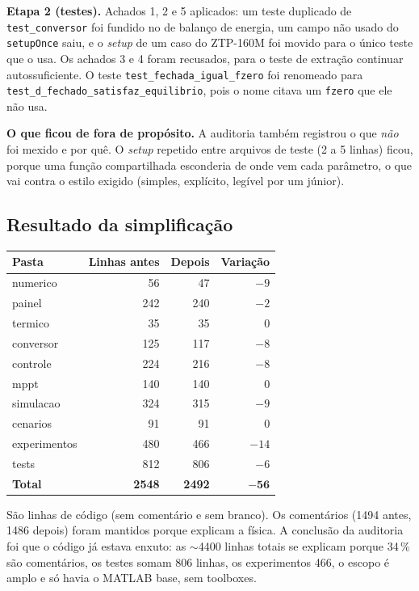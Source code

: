 \textbf{Etapa 2 (testes).} Achados 1, 2 e 5 aplicados: um teste duplicado de \texttt{test\_conversor} foi fundido no de balan\c{c}o de energia, um campo n\~ao usado do \texttt{setupOnce} saiu, e o
\emph{setup} de um caso do ZTP-160M foi movido para o \'unico teste que o usa. Os achados 3 e 4 foram recusados, para o teste de extra\c{c}\~ao continuar autossuficiente. O teste \texttt{test\_fechada\_igual\_fzero}
foi renomeado para \texttt{test\_d\_fechado\_satisfaz\_equilibrio}, pois o nome citava um \texttt{fzero} que ele n\~ao usa.

\textbf{O que ficou de fora de prop\'osito.} A auditoria tamb\'em registrou o que \emph{n\~ao} foi mexido e por qu\^e. O \emph{setup} repetido entre arquivos de teste (2 a 5 linhas) ficou, porque uma fun\c{c}\~ao compartilhada
esconderia de onde vem cada par\^ametro, o que vai contra o estilo exigido (simples, expl\'icito, leg\'ivel por um j\'unior).

\subsection{Resultado da simplifica\c{c}\~ao}

\begin{center}\small
\begin{tabular}{@{}lrrr@{}}
\toprule
Pasta & Linhas antes & Depois & Varia\c{c}\~ao \\ \midrule
numerico & 56 & 47 & $-9$ \\
painel & 242 & 240 & $-2$ \\
termico & 35 & 35 & 0 \\
conversor & 125 & 117 & $-8$ \\
controle & 224 & 216 & $-8$ \\
mppt & 140 & 140 & 0 \\
simulacao & 324 & 315 & $-9$ \\
cenarios & 91 & 91 & 0 \\
experimentos & 480 & 466 & $-14$ \\
tests & 812 & 806 & $-6$ \\
\textbf{Total} & \textbf{2548} & \textbf{2492} & $\boldsymbol{-56}$ \\
\bottomrule
\end{tabular}
\end{center}

S\~ao linhas de c\'odigo (sem coment\'ario e sem branco). Os coment\'arios (1494 antes, 1486 depois) foram mantidos porque explicam a f\'isica. A conclus\~ao da auditoria foi que o c\'odigo j\'a estava enxuto: as
$\sim$4400 linhas totais se explicam porque 34\,\% s\~ao coment\'arios, os testes somam 806 linhas, os experimentos 466, o escopo \'e amplo e s\'o havia o MATLAB base, sem toolboxes.


